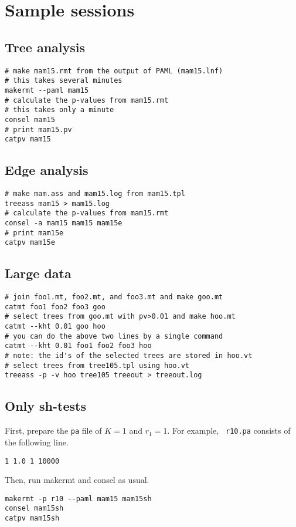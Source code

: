 \documentclass[12pt]{article}
\begin{document}
\section{Sample sessions} \label{sec:sample}

\subsection{Tree analysis}

\begin{verbatim}
# make mam15.rmt from the output of PAML (mam15.lnf)
# this takes several minutes
makermt --paml mam15
# calculate the p-values from mam15.rmt
# this takes only a minute
consel mam15
# print mam15.pv
catpv mam15
\end{verbatim}

\subsection{Edge analysis}

\begin{verbatim}
# make mam.ass and mam15.log from mam15.tpl
treeass mam15 > mam15.log
# calculate the p-values from mam15.rmt
consel -a mam15 mam15 mam15e
# print mam15e
catpv mam15e
\end{verbatim}

\subsection{Large data}

\begin{verbatim}
# join foo1.mt, foo2.mt, and foo3.mt and make goo.mt
catmt foo1 foo2 foo3 goo
# select trees from goo.mt with pv>0.01 and make hoo.mt
catmt --kht 0.01 goo hoo
# you can do the above two lines by a single command
catmt --kht 0.01 foo1 foo2 foo3 hoo 
# note: the id's of the selected trees are stored in hoo.vt
# select trees from tree105.tpl using hoo.vt
treeass -p -v hoo tree105 treeout > treeout.log
\end{verbatim}

\subsection{Only sh-tests}

First, prepare the {\tt pa} file of $K=1$ and $r_1=1$. For example, {\tt
r10.pa} consists of the following line.
\begin{verbatim}
1 1.0 1 10000
\end{verbatim}
Then, run makermt and consel as usual.
\begin{verbatim}
makermt -p r10 --paml mam15 mam15sh
consel mam15sh
catpv mam15sh
\end{verbatim}
\end{document}
